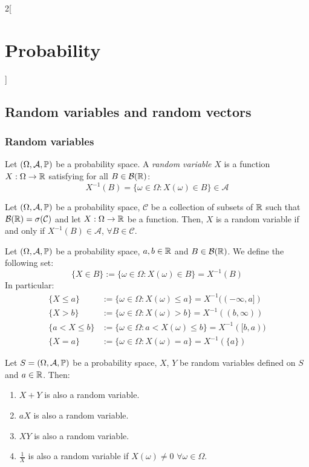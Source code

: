 \documentclass[../../../main.tex]{subfiles}
\begin{document}
\begin{multicols}{2}[\section{Probability}]
  \subsection{Random variables and random vectors}
  \subsubsection{Random variables}
  \begin{definition}
    Let $(\Omega,\mathcal{A},\mathbb{P})$ be a probability space. A \textit{random variable} $X$ is a function $X:\Omega\rightarrow\mathbb{R}$ satisfying for all $B\in\mathcal{B}(\mathbb{R})$: $$X^{-1}(B)=\{\omega\in\Omega:X(\omega)\in B\}\in\mathcal{A}$$
  \end{definition}
  \begin{prop}
    Let $(\Omega,\mathcal{A},\mathbb{P})$ be a probability space, $\mathcal{C}$ be a collection of subsets of $\mathbb{R}$ such that $\mathcal{B}(\mathbb{R})=\sigma(\mathcal{C})$ and let $X:\Omega\rightarrow\mathbb{R}$ be a function. Then, $X$ is a random variable if and only if $X^{-1}(B)\in\mathcal{A}$, $\forall B\in \mathcal{C}$.
  \end{prop}
  \begin{definition}
    Let $(\Omega,\mathcal{A},\mathbb{P})$ be a probability space, $a,b\in\mathbb{R}$ and $B\in\mathcal{B}(\mathbb{R})$. We define the following set:
    $$\{X\in B\}:=\{\omega\in\Omega:X(\omega)\in B\}=X^{-1}(B)$$
    In particular:
    \begin{align*}
      \{X\leq a\}   & :=\{\omega\in\Omega:X(\omega)\leq a\}=X^{-1}((-\infty,a]) \\
      \{X> b\}      & :=\{\omega\in\Omega:X(\omega)>b\}=X^{-1}((b,\infty))      \\
      \{a<X\leq b\} & :=\{\omega\in\Omega:a< X(\omega)\leq b\}=X^{-1}([b,a))    \\
      \{X=a\}       & :=\{\omega\in\Omega:X(\omega)=a\}=X^{-1}(\{a\})
    \end{align*}
  \end{definition}
  \begin{prop}
    Let $S=(\Omega,\mathcal{A},\mathbb{P})$ be a probability space, $X$, $Y$ be random variables defined on $S$ and $a\in\mathbb{R}$. Then:
    \begin{enumerate}
      \item $X+Y$ is also a random variable.
      \item $aX$ is also a random variable.
      \item $XY$ is also a random variable.
      \item $\frac{1}{X}$ is also a random variable if $X(\omega)\ne 0$ $\forall \omega\in\Omega$.

\end{enumerate}
\end{prop}
\end{multicols}
\end{document}
